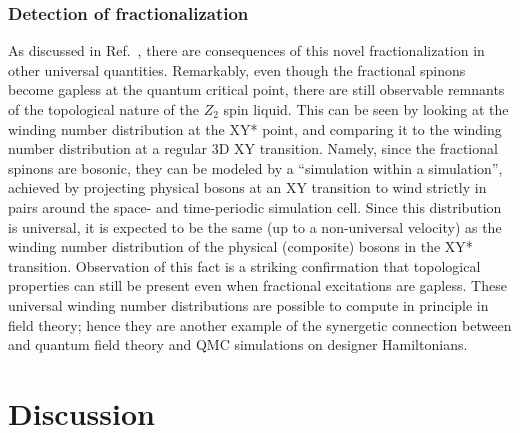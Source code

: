 \documentclass[range]{ar2e}
\begin{document}
\subsubsection{Detection of fractionalization}

As discussed in Ref.~\cite{XYstarQMC}, there are consequences of this novel fractionalization in other universal quantities.  Remarkably, even though the fractional spinons become gapless at the quantum critical point, there are still observable remnants of the topological nature of the $Z_2$ spin liquid.  This can be seen by looking at the winding number distribution at the XY* point, and comparing it to the winding number distribution at a regular 3D XY transition.  Namely, since the fractional spinons are bosonic, they can be modeled by a ``simulation within a simulation'', achieved by projecting physical bosons at an XY transition to wind strictly in pairs around the space- and time-periodic simulation cell.  Since this distribution is universal, it is expected to be the same (up to a non-universal velocity) as the winding number distribution of the physical (composite) bosons in the XY* transition.  Observation of this fact \cite{XYstarQMC} is a striking confirmation that topological properties can still be present even when fractional excitations are gapless.  These universal winding number distributions are possible to compute in principle in field theory; hence they are another example of the synergetic connection between and quantum field theory and QMC simulations on designer Hamiltonians.


\section{Discussion}
\label{sec:discussion}
\end{document}
